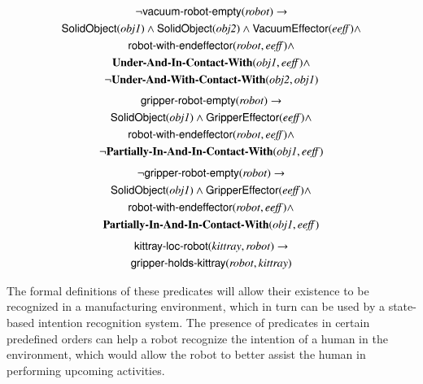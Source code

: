 \documentclass[preprint,12pt]{elsarticle}
\newcommand{\class}[1] {\textsf{#1}}
\newcommand{\stvar}[1] {\textsf{#1}}
\begin{document}
\begin{gather}
\label{eq:neg-vacuum-robot-empty}
\neg\stvar{vacuum-robot-empty}(\mathit{robot}) \rightarrow \\
\class{SolidObject}(\mathit{obj1}) \wedge \class{SolidObject}(\mathit{obj2}) \wedge \class{VacuumEffector}(\mathit{eeff}) \wedge\notag\\
\stvar{robot-with-endeffector}(\mathit{robot},\mathit{eeff}) \wedge \notag\\ \textbf{Under-And-In-Contact-With}(\mathit{obj1},\mathit{eeff}) \wedge \notag\\
\neg \textbf{Under-And-With-Contact-With}(\mathit{obj2},\mathit{obj1})\notag
\end{gather}
\begin{gather}
\label{eq:gripper-robot-empty}
\stvar{gripper-robot-empty}(\mathit{robot}) \rightarrow \\
\class{SolidObject}(\mathit{obj1}) \wedge \class{GripperEffector}(\mathit{eeff}) \wedge\notag\\
\stvar{robot-with-endeffector}(\mathit{robot},\mathit{eeff}) \wedge \notag \\
\neg \textbf{Partially-In-And-In-Contact-With}(\mathit{obj1},\mathit{eeff})\notag
\end{gather}
\begin{gather}
\label{eq:neg-gripper-robot-empty}
\neg\stvar{gripper-robot-empty}(\mathit{robot}) \rightarrow \\
\class{SolidObject}(\mathit{obj1}) \wedge \class{GripperEffector}(\mathit{eeff}) \wedge\notag\\
\stvar{robot-with-endeffector}(\mathit{robot},\mathit{eeff}) \wedge\notag\\
\textbf{Partially-In-And-In-Contact-With}(\mathit{obj1},\mathit{eeff})\notag
\end{gather}
\begin{gather}
\label{eq:kittray-loc-robot}
\stvar{kittray-loc-robot}(\mathit{kittray},\mathit{robot}) \rightarrow \\
\stvar{gripper-holds-kittray}(\mathit{robot},\mathit{kittray}) \notag
\end{gather}


The formal definitions of these predicates will allow their existence to be recognized in a manufacturing environment, which in turn can be used by a state-based intention recognition system. The presence of predicates in certain predefined orders can help a robot recognize the intention of a human in the environment, which would allow the robot to better assist the human in performing upcoming activities.
\end{document}
